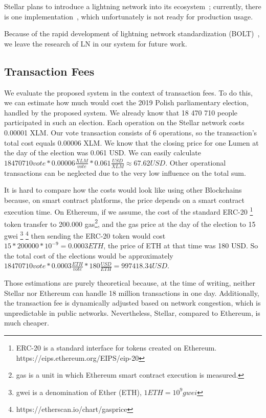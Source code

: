 \documentclass[applsci,article,submit,moreauthors,pdftex]{Definitions/mdpi}
\begin{document}
Stellar plans to introduce a lightning network into its ecosystem~\cite{Lightnin14:online}; currently, there is one implementation~\cite{interste55:online}, which unfortunately is not ready for production usage. 

Because of the rapid development of lightning network standardization (BOLT)~\cite{poon2016bitcoin}, we leave the research of LN in our system for future work. 

\subsection{Transaction Fees}
We evaluate the proposed system in the context of transaction fees. To do this, we can estimate how much would cost the 2019 Polish parliamentary election, handled by the proposed system. We already know that 18 470 710 people participated in such an election. Each operation on the Stellar network costs 0.00001 XLM. Our vote transaction consists of 6 operations, so the transaction's total cost equals 0.00006 XLM. We know that the closing price for one Lumen at the day of the election was 0.061 USD. We can easily calculate \(18470710 vote * 0.00006 \frac{XLM}{vote} * 0.061 \frac{USD}{XLM} \approx 67.62 USD\). Other operational transactions can be neglected due to the very low influence on the total sum.

It is hard to compare how the costs would look like using other Blockchains because, on smart contract platforms, the price depends on a smart contract execution time. On Ethereum, if we assume, the cost of the standard ERC-20 \footnote{ERC-20 is a standard interface for tokens created on Ethereum.  https://eips.ethereum.org/EIPS/eip-20} token transfer to 200.000 gas\footnote{gas is a unit in which Ethereum smart contract execution is measured.}, and the gas price at the day of the election to 15 gwei \footnote{gwei is a denomination of Ether (ETH), $1 ETH = 10^{9} gwei$} \footnote{https://etherscan.io/chart/gasprice} then sending the ERC-20 token would cost $15 * 200000 * 10^{-9} = 0.0003 ETH$, the price of ETH at that time was 180 USD. So the total cost of the elections would be approximately \(18470710 vote * 0.0003 \frac{ETH}{vote} * 180 \frac{USD}{ETH} = 99 7418.34  USD\). 

Those estimations are purely theoretical because, at the time of writing, neither Stellar nor Ethereum can handle 18 million transactions in one day. Additionally, the transaction fee is dynamically adjusted based on network congestion, which is unpredictable in public networks. Nevertheless, Stellar, compared to Ethereum, is much cheaper.
\end{document}
